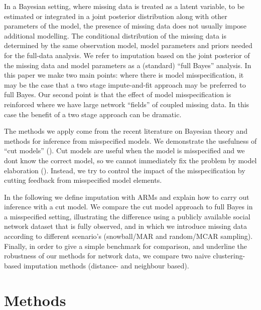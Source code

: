 \documentclass{article}
\begin{document}
In a Bayesian setting, where missing data is treated as a latent variable, to be estimated or integrated in a joint posterior distribution along with other parameters of the model, the presence of missing data does not usually impose additional modelling. The conditional distribution of the missing data is determined by the same observation model, model parameters and priors needed for the full-data analysis. We refer to imputation based on the joint posterior of the missing data and model parameters as a (standard) ``full Bayes'' analysis. In this paper we make two main points: where there is model misspecification, it may be the case that a two stage impute-and-fit approach may be preferred to full Bayes. Our second point is that the effect of model misspecification is reinforced where we have large network ``fields'' of coupled missing data. In this case the benefit of a two stage approach can be dramatic.

The methods we apply come from the recent literature on Bayesian theory and methods for inference from misspecified models. We demonstrate the usefulness of ``cut models'' (\cites{plummer2015cuts, lunn2009combining, jacob2017better}). Cut models are useful when the model is misspecified and we dont know the correct model, so we cannot immediately fix the problem by model elaboration (\cite{gelman2004parameterization}). Instead, we try to control the impact of the misspecification by cutting feedback from misspecified model elements.

 In the following we define imputation with ARMs and explain how to carry out inference with a cut model. We compare the cut model approach to full Bayes in a misspecified setting,
 illustrating the difference using a publicly available social network dataset that is fully observed, and in which we introduce missing data according to different scenario's (snowball/MAR and random/MCAR sampling). Finally, in order to give a simple benchmark for comparison, and underline the robustness of our methods for network data, we compare two naive clustering-based imputation methods (distance- and neighbour based).
 

\section{Methods}
\end{document}
